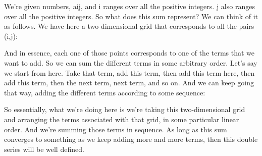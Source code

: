 \documentclass[pdftex, brazil, 12pt, twoside]{article}
\begin{document}
We're given numbers, aij, and i ranges over all
the positive integers.
j also ranges over all the positive integers.
So what does this sum represent?
We can think of it as follows.
We have here a two-dimensional grid that corresponds to all
the pairs (i,j):

\begin{figure}[H]
  \begin{center}
  \end{center}
\end{figure}

And in essence, each one of those points corresponds to
one of the terms that we want to add.
So we can sum the different terms in some arbitrary order.
Let's say we start from here.
Take that term, add this term, then add this term here, then
add this term, then the next term, next term, and so on.
And we can keep going that way, adding the different
terms according to some sequence:

\begin{figure}[H]
  \begin{center}
  \end{center}
\end{figure}

So essentially, what we're doing here is we're taking
this two-dimensional grid and arranging the terms associated
with that grid, in some particular linear order.
And we're summing those terms in sequence.
As long as this sum converges to something as we keep adding
more and more terms, then this double series
will be well defined.
\end{document}
